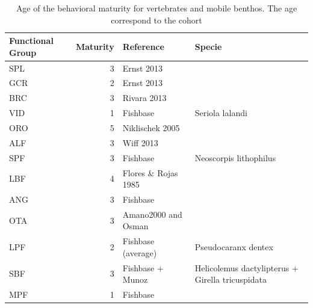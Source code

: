 \documentclass[11pt]{article}
\begin{document}
\begin{itemize}
\begin{table}[htb]
\caption{Age of the behavioral maturity for vertebrates and mobile benthos. The age correspond to the cohort}
\begin{center}
\begin{tabular}{lrll}
 Functional Group  &  Maturity  &  Reference             &  Specie                                             \\
\hline
 SPL               &         3  &  Ernst 2013            &                                                     \\
 GCR               &         2  &  Ernst 2013            &                                                     \\
 BRC               &         3  &  Rivara 2013           &                                                     \\
 VID               &         1  &  Fishbase              &  Seriola lalandi                                    \\
 ORO               &         5  &  Niklischek 2005       &                                                     \\
 ALF               &         3  &  Wiff 2013             &                                                     \\
 SPF               &         3  &  Fishbase              &  Neoscorpis lithophilus                             \\
 LBF               &         4  &  Flores \& Rojas 1985  &                                                     \\
 ANG               &         3  &  Fishbase              &                                                     \\
 OTA               &         3  &  Amano2000 and Osman   &                                                     \\
 LPF               &         2  &  Fishbase (average)    &  Pseudocaranx dentex                                \\
 SBF               &         3  &  Fishbase  + Munoz     &  Helicolemus dactylipterus  + Girella tricuspidata  \\
 MPF               &         1  &  Fishbase              &                                                     \\
\end{tabular}
\end{center}
\end{table}



\end{itemize}
\end{document}
